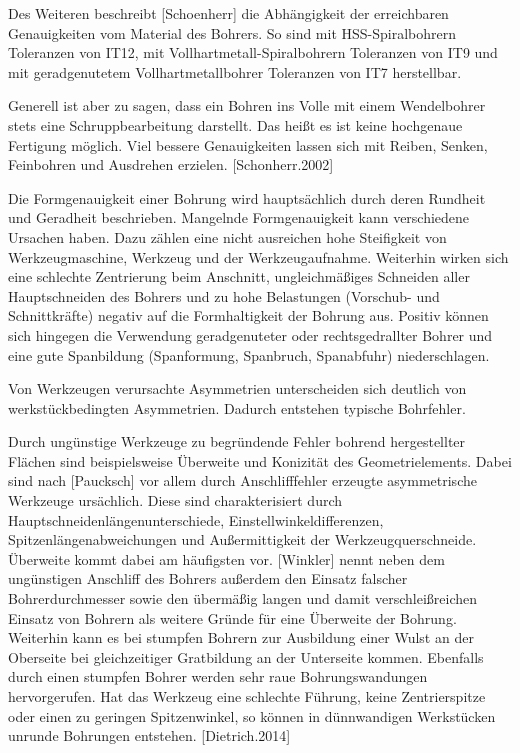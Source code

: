 Des Weiteren beschreibt [Schoenherr] die Abhängigkeit der erreichbaren Genauigkeiten vom Material des Bohrers. So sind mit HSS-Spiralbohrern Toleranzen von IT12, mit Vollhartmetall-Spiralbohrern Toleranzen von IT9 und mit geradgenutetem Vollhartmetallbohrer Toleranzen von IT7 herstellbar. 

Generell ist aber zu sagen, dass ein Bohren ins Volle mit einem Wendelbohrer stets eine Schruppbearbeitung darstellt. Das heißt es ist keine hochgenaue Fertigung möglich. Viel bessere Genauigkeiten lassen sich mit Reiben, Senken, Feinbohren und Ausdrehen erzielen. [Schonherr.2002]

Die Formgenauigkeit einer Bohrung wird hauptsächlich durch deren Rundheit und Geradheit beschrieben. Mangelnde Formgenauigkeit kann verschiedene Ursachen haben. Dazu zählen eine nicht ausreichen hohe Steifigkeit von Werkzeugmaschine, Werkzeug und der Werkzeugaufnahme. Weiterhin wirken sich eine schlechte Zentrierung beim Anschnitt, ungleichmäßiges Schneiden aller Hauptschneiden des Bohrers und zu hohe Belastungen (Vorschub- und Schnittkräfte) negativ auf die Formhaltigkeit der Bohrung aus. Positiv können sich hingegen die Verwendung geradgenuteter oder rechtsgedrallter Bohrer und eine gute Spanbildung (Spanformung, Spanbruch, Spanabfuhr) niederschlagen. 

Von Werkzeugen verursachte Asymmetrien unterscheiden sich deutlich von werkstückbedingten Asymmetrien. Dadurch entstehen typische Bohrfehler.

Durch ungünstige Werkzeuge zu begründende Fehler bohrend hergestellter Flächen sind beispielsweise Überweite und Konizität des Geometrielements. Dabei sind nach [Paucksch] vor allem durch Anschlifffehler erzeugte asymmetrische Werkzeuge ursächlich. Diese sind charakterisiert durch Hauptschneidenlängenunterschiede, Einstellwinkeldifferenzen, Spitzenlängenabweichungen und Außermittigkeit der Werkzeugquerschneide.
Überweite kommt dabei am häufigsten vor. [Winkler] nennt neben dem ungünstigen Anschliff des Bohrers außerdem den Einsatz falscher Bohrerdurchmesser sowie den übermäßig langen und damit verschleißreichen Einsatz von Bohrern als weitere Gründe für eine Überweite der Bohrung. 
Weiterhin kann es bei stumpfen Bohrern zur Ausbildung einer Wulst an der Oberseite bei gleichzeitiger Gratbildung an der Unterseite kommen. Ebenfalls durch einen stumpfen Bohrer werden sehr raue Bohrungswandungen hervorgerufen. 
Hat das Werkzeug eine schlechte Führung, keine Zentrierspitze oder einen zu geringen Spitzenwinkel, so können in dünnwandigen Werkstücken unrunde Bohrungen entstehen. [Dietrich.2014]

